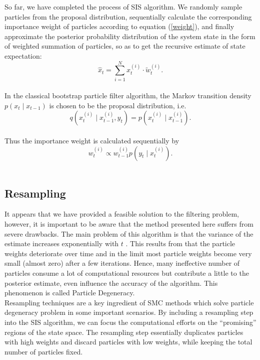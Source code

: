 \documentclass[mstat,12pt]{unswthesis}  %
\numberwithin{equation}{section}
\begin{document}
\noindent So far, we have completed the process of SIS algorithm.
We randomly sample particles from the proposal distribution,
sequentially calculate the corresponding importance weight
of particles according to equation (\ref{weight}), 
and finally approximate the posterior probability distribution of the system state in the form of  weighted summation of particles, so as to get the recursive estimate of state expectation:
\begin{equation}\hat{x}_{t}=\sum_{i=1}^{N} x_{t}^{(i)} \cdot \tilde{w}_{t}^{(i)}.\end{equation}\\

\noindent In the classical bootstrap particle
filter algorithm, the Markov transition density
$p\left( x_{t} \mid x_{t-1}\right)$
is chosen to be
the proposal distribution, i.e.
\begin{equation}
 q\left( x_{t}^{(i)} \mid x_{t-1}^{(i)},y_{t}\right)
 =p\left( x_{t}^{(i)} \mid x_{t-1}^{(i)}\right).
\end{equation}\\

\noindent Thus the importance weight is calculated sequentially by
\begin{equation}
w_{t}^{(i)} \propto
w_{t-1}^{(i)}   p\left(y_{t} \mid x_{t}^{(i)}\right).
\end{equation}\\

\subsection{Resampling}
\noindent It appears that we have provided a feasible solution to the filtering problem, however, it is important to be aware that the method presented here suffers from severe drawbacks.
The main problem of this algorithm is that the variance of the estimate increases exponentially with $t$ \cite{kong1994sequential}.
This results from that the particle weights deteriorate over time
and in the limit most particle weights become very small (almost zero) after a few iterations.
Hence, many ineffective number of particles consume a lot of computational resources but contribute a little to the posterior estimate, even influence the accuracy of the algorithm.
This phenomenon is called Particle Degeneracy.\\

\noindent Resampling techniques are a key ingredient of SMC methods which  solve particle degeneracy problem in
some important scenarios.
By including a resampling step into the SIS algorithm, we can  focus the computational efforts
on the “promising” regions of the state space. The resampling step essentially
duplicates particles with high weights and discard particles with low weights,
while keeping the total number of particles fixed.\\
\end{document}
